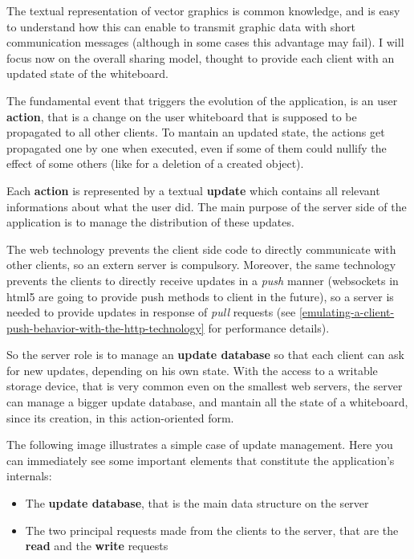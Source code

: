 \documentclass[10pt,a4paper,english]{book}
\begin{document}
The textual representation of vector graphics is common knowledge, and
is easy to understand how this can enable to transmit graphic data
with short communication messages (although in some cases this
advantage may fail). I will focus now on the overall sharing model,
thought to provide each client with an updated state of the
whiteboard.

The fundamental event that triggers the evolution of the application,
is an user \textbf{action}, that is a change on the user whiteboard that is
supposed to be propagated to all other clients. To mantain an updated
state, the actions get propagated one by one when executed, even if
some of them could nullify the effect of some others (like for a
deletion of a created object).

Each \textbf{action} is represented by a textual \textbf{update} which contains
all relevant informations about what the user did. The main purpose of
the server side of the application is to manage the distribution of
these updates.

The web technology prevents the client side code to directly
communicate with other clients, so an extern server is
compulsory. Moreover, the same technology prevents the clients to
directly receive updates in a \emph{push} manner (websockets in html5 are
going to provide push methods to client in the future), so a server is
needed to provide updates in response of \emph{pull} requests (see
\href{\#emulating-a-client-push-behavior-with-the-http-technology}{\ref*{emulating-a-client-push-behavior-with-the-http-technology}} for
performance details).

So the server role is to manage an \textbf{update database} so that each
client can ask for new updates, depending on his own state. With the
access to a writable storage device, that is very common even on the
smallest web servers, the server can manage a bigger update database,
and mantain all the state of a whiteboard, since its creation, in this
action-oriented form.

The following image illustrates a simple case of update
management. Here you can immediately see some important elements that
constitute the application's internals:
\begin{itemize}
\item {} 
The \textbf{update database}, that is the main data structure on the
server

\item {} 
The two principal requests made from the clients to the server, that
are the \textbf{read} and the \textbf{write} requests

\end{itemize}
\end{document}
